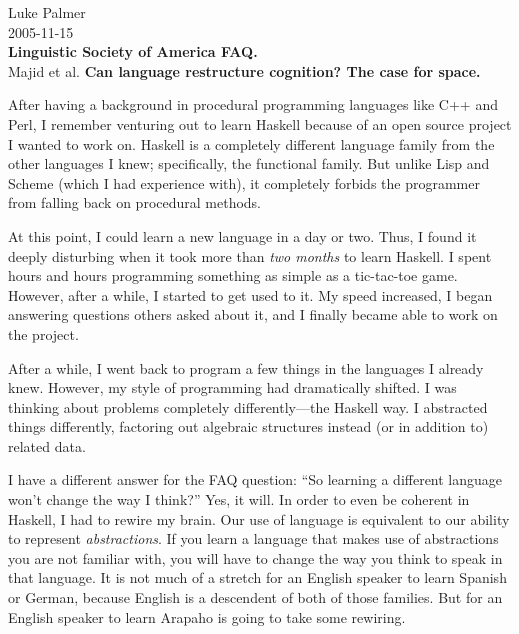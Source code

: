 \documentclass[12pt]{article}
\begin{document}
\noindent 
Luke Palmer \\
2005-11-15 \\
\textbf{Linguistic Society of America FAQ.} \\
Majid et al.  \textbf{Can language restructure cognition?  The case for
space.}

\addvspace{1cm}

After having a background in procedural programming languages like C++
and Perl, I remember venturing out to learn Haskell because of an open
source project I wanted to work on.  Haskell is a completely different
language family from the other languages I knew; specifically, the
functional family.  But unlike Lisp and Scheme (which I had experience
with), it completely forbids the programmer from falling back on
procedural methods.

At this point, I could learn a new language in a day or two.  Thus, I
found it deeply disturbing when it took more than \textit{two months} to
learn Haskell.  I spent hours and hours programming something as simple
as a tic-tac-toe game.  However, after a while, I started to get used to
it.  My speed increased, I began answering questions others asked about
it, and I finally became able to work on the project.

After a while, I went back to program a few things in the languages I
already knew.  However, my style of programming had dramatically
shifted.  I was thinking about problems completely differently---the
Haskell way.  I abstracted things differently, factoring out algebraic
structures instead (or in addition to) related data. 

I have a different answer for the FAQ question: ``So learning a
different language won't change the way I think?''  Yes, it will.  In
order to even be coherent in Haskell, I had to rewire my brain.  Our use
of language is equivalent to our ability to represent
\textit{abstractions}.  If you learn a language that makes use of
abstractions you are not familiar with, you will have to change the way
you think to speak in that language.  It is not much of a stretch for an
English speaker to learn Spanish or German, because English is a
descendent of both of those families.  But for an English speaker to
learn Arapaho is going to take some rewiring.
\end{document}
